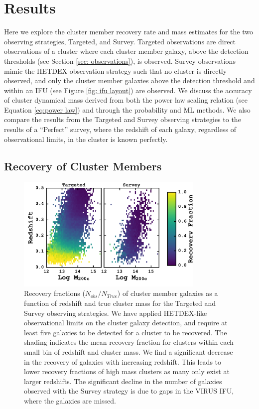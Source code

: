 \section{Results}\label{sec:results}
Here we explore the cluster member recovery rate and mass estimates for the two observing strategies, Targeted, and Survey. Targeted observations are direct observations of a cluster where each cluster member galaxy, above the detection thresholds (see Section \ref{sec: observations}), is observed. Survey observations mimic the HETDEX observation strategy such that no cluster is directly observed, and only the cluster member galaxies above the detection threshold and within an IFU (see Figure \ref{fig: ifu layout}) are observed.  We discuss the accuracy of cluster dynamical mass derived from both the power law scaling relation (see Equation \ref{eq:power law}) and through the probability and ML methods. We also compare the results from the Targeted and Survey observing strategies to the results of a ``Perfect'' survey, where the redshift of each galaxy, regardless of observational limits, in the cluster is known perfectly.

\subsection{Recovery of Cluster Members}
\begin{figure}
	\begin{center}
		\includegraphics[width=0.8\textwidth]{figures1/recovery.pdf} 
	\end{center}
\caption[Recovery fractions for the Targeted and Survey observations.]{Recovery fractions ($N_{obs}/N_{True}$) of cluster member galaxies as a function of redshift and true cluster mass for the Targeted and Survey observing strategies. We have applied HETDEX-like observational limits on the cluster galaxy detection, and require at least five galaxies to be detected for a cluster to be recovered. The shading indicates the mean recovery fraction for clusters within each small bin of redshift and cluster mass. We find a significant decrease in the recovery of galaxies with increasing redshift. This leads to lower recovery fractions of high mass clusters as many only exist at larger redshifts. The significant decline in the number of galaxies observed with the Survey strategy is due to gaps in the VIRUS IFU, where the galaxies are missed.} 
	\label{fig: recovery} 
\end{figure}

